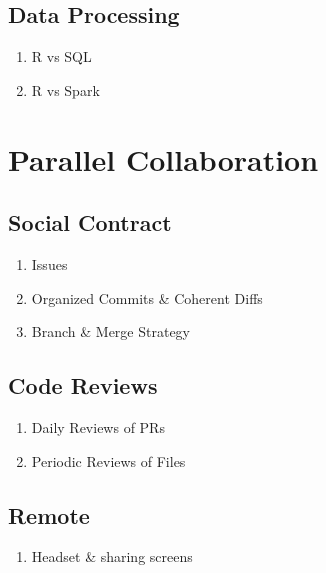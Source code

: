 \documentclass[
]{book}
\providecommand{\tightlist}{%
  \setlength{\itemsep}{0pt}\setlength{\parskip}{0pt}}
\begin{document}
\hypertarget{data-processing}{%
\section{Data Processing}\label{data-processing}}

\begin{enumerate}
\def\labelenumi{\arabic{enumi}.}
\tightlist
\item
  R vs SQL
\item
  R vs Spark
\end{enumerate}

\hypertarget{collaboration}{%
\chapter{Parallel Collaboration}\label{collaboration}}

\hypertarget{social-contract}{%
\section{Social Contract}\label{social-contract}}

\begin{enumerate}
\def\labelenumi{\arabic{enumi}.}
\tightlist
\item
  Issues
\item
  Organized Commits \& Coherent Diffs
\item
  Branch \& Merge Strategy
\end{enumerate}

\hypertarget{code-reviews}{%
\section{Code Reviews}\label{code-reviews}}

\begin{enumerate}
\def\labelenumi{\arabic{enumi}.}
\tightlist
\item
  Daily Reviews of PRs
\item
  Periodic Reviews of Files
\end{enumerate}

\hypertarget{remote}{%
\section{Remote}\label{remote}}

\begin{enumerate}
\def\labelenumi{\arabic{enumi}.}
\tightlist
\item
  Headset \& sharing screens
\end{enumerate}
\end{document}
